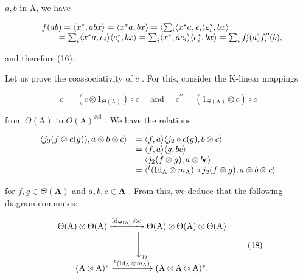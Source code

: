\(a, b\) in A, we have

\[
\begin{array}{r l} & {f (a b) = \langle x ^ {*}, a b x \rangle = \langle x ^ {*} a, b x \rangle = \left\langle \sum_ {i} \langle x ^ {*} a, e _ {i} \rangle e _ {i} ^ {*}, b x \right\rangle} \\ & {\qquad = \sum_ {i} \langle x ^ {*} a, e _ {i} \rangle \langle e _ {i} ^ {*}, b x \rangle = \sum_ {i} \langle x ^ {*}, a e _ {i} \rangle \langle e _ {i} ^ {*}, b x \rangle = \sum_ {i} f _ {i} ^ {\prime} (a) f _ {i} ^ {\prime \prime} (b),} \end{array}
\]

and therefore (16).

Let us prove the coassociativity of \(c\) . For this, consider the K-linear mappings

\[
c ^ {\prime} = \left(c \otimes 1 _ {\Theta (\mathrm{A})}\right) \circ c \quad \text { and } \quad c ^ {\prime \prime} = \left(1 _ {\Theta (\mathrm{A})} \otimes c\right) \circ c
\]

from \(\Theta (\mathrm{A})\) to \(\Theta (\mathrm{A})^{\otimes 3}\) . We have the relations

\[
\begin{array}{r l} \langle j _ {3} (f \otimes c (g)), a \otimes b \otimes c \rangle & = \langle f, a \rangle \langle j _ {2} \circ c (g), b \otimes c \rangle \\ & = \langle f, a \rangle \langle g, b c \rangle \\ & = \langle j _ {2} (f \otimes g), a \otimes b c \rangle \\ & = \langle^ {t} (\mathrm{Id} _ {\mathrm{A}} \otimes m _ {\mathrm{A}}) \circ j _ {2} (f \otimes g), a \otimes b \otimes c \rangle \end{array}
\]

for \(f, g \in \Theta(\mathbf{A})\) and \(a, b, c \in \mathbf{A}\) . From this, we deduce that the following diagram commutes:

\[
\begin{array}{c} \Theta (\mathrm{A}) \otimes \Theta (\mathrm{A}) \xrightarrow {\operatorname{Id} _ {\Theta (\mathrm{A})} \otimes c} \Theta (\mathrm{A}) \otimes \Theta (\mathrm{A}) \otimes \Theta (\mathrm{A}) \\ \Biggl \downarrow_ {j _ {2}} \\ (\mathrm{A} \otimes \mathrm{A}) ^ {*} \xrightarrow {^ t (\operatorname{Id} _ {\mathrm{A}} \otimes m _ {\mathrm{A}})} (\mathrm{A} \otimes \mathrm{A} \otimes \mathrm{A}) ^ {*}. \end{array}\tag{18}
\]

